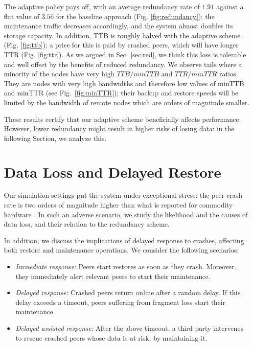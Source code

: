 \documentclass[conference,10pt]{IEEEtran}
\begin{document}
The adaptive policy pays off, with an average redundancy rate of
$1.91$ against a flat value of $3.56$ for the baseline approach
(Fig. \ref{fig:redundancy}); the maintenance traffic decreases
accordingly, and the system almost doubles its storage capacity. In
addition, TTB is roughly halved with the adaptive scheme
(Fig. \ref{fig:ttb}); a price for this is paid by crashed peers, which
will have longer TTR (Fig. \ref{fig:ttr}). As we argued in
Sec. \ref{sec:red}, we think this loss is tolerable and well offset by
the benefits of reduced redundancy. We observe
tails where a minority of the nodes have very high $TTB/minTTB$ and
$TTR/minTTR$ ratios. They are nodes with very high bandwidths and
therefore low values of minTTB and minTTR (see Fig.~\ref{fig:minTTR});
their backup and restore speeds will be limited by the bandwidth of
remote nodes which are orders of magnitude smaller.


These results certify that our adaptive scheme beneficially affects performance. However, lower redundancy might result in higher risks of losing data: in the following Section, we analyze this.

\section{Data Loss and Delayed Restore}
\label{sec:repair}

Our simulation settings put the system under exceptional stress: the peer crash rate is two orders of magnitude higher than what is reported for commodity hardware \cite{fast07}. In such an adverse scenario, we study the likelihood and the causes of data loss, and their relation to the redundancy scheme. 

In addition, we discuss the implications of delayed response to crashes, affecting both restore and maintenance operations. We consider the following scenarios:

\begin{itemize}
\item \emph{Immediate response:} Peers start restores as soon as they crash. Moreover, they immediately alert relevant peers to start their maintenance.
\item \emph{Delayed response:} Crashed peers return online after a
      random delay. If this delay exceeds a timeout, peers suffering from fragment loss start their maintenance.
\item \emph{Delayed assisted response:} After the above timeout, a third party intervenes to rescue crashed peers whose data is at risk, by maintaining it.
\end{itemize}
\end{document}
